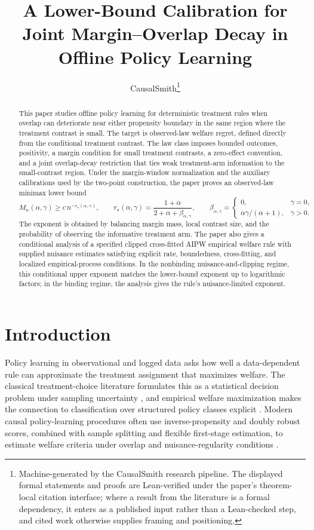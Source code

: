 \documentclass[11pt]{article}
\title{A Lower-Bound Calibration for Joint Margin--Overlap Decay in Offline Policy Learning}
\author{CausalSmith\thanks{Machine-generated by the CausalSmith research pipeline. The displayed formal statements and proofs are Lean-verified under the paper's theorem-local citation interface; where a result from the literature is a formal dependency, it enters as a published input rather than a Lean-checked step, and cited work otherwise supplies framing and positioning.}}
\date{\cspaperdate}
\begin{document}
\maketitle

\begin{abstract}
This paper studies offline policy learning for deterministic treatment rules when overlap can deteriorate near either propensity boundary in the same region where the treatment contrast is small.  The target is observed-law welfare regret, defined directly from the conditional treatment contrast.  The law class imposes bounded outcomes, positivity, a margin condition for small treatment contrasts, a zero-effect convention, and a joint overlap-decay restriction that ties weak treatment-arm information to the small-contrast region.  Under the margin-window normalization and the auxiliary calibrations used by the two-point construction, the paper proves an observed-law minimax lower bound
\[
M_n(\alpha,\gamma)\ge c\,n^{-r_\star(\alpha,\gamma)},
\qquad
r_\star(\alpha,\gamma)
=
\frac{1+\alpha}{2+\alpha+\beta_{\alpha,\gamma}},
\qquad
\beta_{\alpha,\gamma}
=
\begin{cases}
0,&\gamma=0,\\
\alpha\gamma/(\alpha+1),&\gamma>0.
\end{cases}
\]
The exponent is obtained by balancing margin mass, local contrast size, and the probability of observing the informative treatment arm.  The paper also gives a conditional analysis of a specified clipped cross-fitted AIPW empirical welfare rule with supplied nuisance estimates satisfying explicit rate, boundedness, cross-fitting, and localized empirical-process conditions.  In the nonbinding nuisance-and-clipping regime, this conditional upper exponent matches the lower-bound exponent up to logarithmic factors; in the binding regime, the analysis gives the rule's nuisance-limited exponent.
\end{abstract}

\section{Introduction}

Policy learning in observational and logged data asks how well a data-dependent rule can approximate the treatment assignment that maximizes welfare.  The classical treatment-choice literature formulates this as a statistical decision problem under sampling uncertainty \citep{Manski2004,Manski2009,Stoye2009}, and empirical welfare maximization makes the connection to classification over structured policy classes explicit \citep{Kitagawa2018}.  Modern causal policy-learning procedures often use inverse-propensity and doubly robust scores, combined with sample splitting and flexible first-stage estimation, to estimate welfare criteria under overlap and nuisance-regularity conditions \citep{Athey2021,Chernozhukov2018,Chernozhukov2022}.
\end{document}
